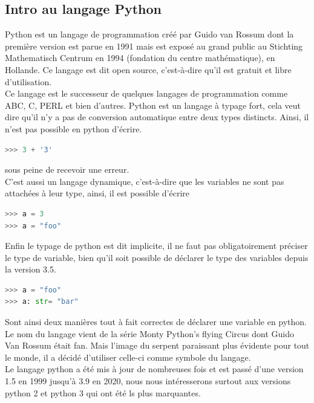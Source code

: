 \documentclass[a4paper, 12pt]{article}
\numberwithin{equation}{subsection}
\begin{document}
\subsection{Intro au langage Python}
Python est un langage de programmation créé par Guido van Rossum dont la première version est parue en 1991 mais est exposé au grand public au Stichting Mathematisch Centrum en 1994 (fondation du centre mathématique), en Hollande. Ce langage est dit open source, c'est-à-dire qu’il est gratuit et libre d’utilisation.\\Ce langage est le successeur de quelques langages de programmation comme ABC,  C, PERL et bien d’autres. Python est un langage à typage fort, cela veut dire qu’il n’y a pas de conversion automatique entre deux types distincts. Ainsi, il n’est pas possible en python d’écrire.\\
\begin{lstlisting}[language=Python]
>>> 3 + '3'
\end{lstlisting}
sous peine de recevoir une erreur.\\
C’est aussi un langage dynamique, c’est-à-dire que les variables ne sont pas attachées à leur type, ainsi, il est possible d’écrire \\
\begin{lstlisting}[language=Python]
>>> a = 3
>>> a = "foo"
\end{lstlisting}
Enfin le typage de python est dit implicite, il ne faut pas obligatoirement préciser le type de variable, bien qu’il soit possible de déclarer le type des variables depuis la version 3.5.\\
\begin{lstlisting}[language=Python]
>>> a = "foo"
>>> a: str= "bar"
\end{lstlisting}
Sont ainsi deux manières tout à fait correctes de déclarer une variable en python.\\
Le nom du langage vient de la série Monty Python’s flying Circus dont Guido Van Rossum était fan. Mais l’image du serpent paraissant plus évidente pour tout le monde, il a décidé d'utiliser celle-ci comme symbole du langage.\\
Le langage python a été mis à jour de nombreuses fois et est passé d’une version 1.5 en 1999 jusqu’à 3.9 en 2020, nous nous intéresserons surtout aux versions python 2 et python 3 qui ont été ls plus marquantes.
\end{document}
